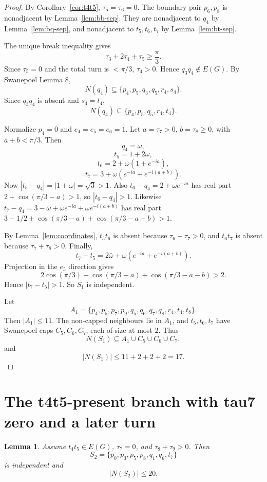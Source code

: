\documentclass[11pt]{article}
\newtheorem{lemma}{Lemma}
\begin{document}
\begin{proof}
By Corollary~\ref{cor:t4t5}, $\tau_5=\tau_6=0$. The boundary pair $p_6,p_8$ is nonadjacent by Lemma~\ref{lem:bb-sep}. They are nonadjacent to $q_4$ by Lemma~\ref{lem:bq-sep}, and nonadjacent to $t_5,t_6,t_7$ by Lemma~\ref{lem:bt-sep}.

The unique break inequality gives
\[
  \tau_3+2\tau_4+\tau_5\ge\frac{\pi}{3}.
\]
Since $\tau_5=0$ and the total turn is $<\pi/3$, $\tau_4>0$. Hence $q_3q_4\notin E(G)$. By Swanepoel Lemma 8,
\[
  N(q_4)\subseteq \{p_4,p_5,q_3,q_5,r_4,s_4\}.
\]
Since $q_3q_4$ is absent and $s_4=t_4$,
\[
  N(q_4)\subseteq\{p_4,p_5,q_5,r_4,t_4\}.
\]

Normalize $p_4=0$ and $e_4=e_5=e_6=1$. Let $a=\tau_7>0$, $b=\tau_8\ge0$, with $a+b<\pi/3$. Then
\[
  q_4=\omega,
\]
\[
  t_5=1+2\omega,
\]
\[
  t_6=2+\omega(1+e^{-ia}),
\]
\[
  t_7=3+\omega(e^{-ia}+e^{-i(a+b)}).
\]
Now $|t_5-q_4|=|1+\omega|=\sqrt3>1$. Also $t_6-q_4=2+\omega e^{-ia}$ has real part $2+\cos(\pi/3-a)>1$, so $|t_6-q_4|>1$. Likewise $t_7-q_4=3-\omega+\omega e^{-ia}+\omega e^{-i(a+b)}$ has real part $3-1/2+\cos(\pi/3-a)+\cos(\pi/3-a-b)>1$.

By Lemma~\ref{lem:coordinates}, $t_5t_6$ is absent because $\tau_6+\tau_7>0$, and $t_6t_7$ is absent because $\tau_7+\tau_8>0$. Finally,
\[
  t_7-t_5=2\bar\omega+\omega(e^{-ia}+e^{-i(a+b)}).
\]
Projection in the $e_5$ direction gives
\[
  2\cos(\pi/3)+\cos(\pi/3-a)+\cos(\pi/3-a-b)>2.
\]
Hence $|t_7-t_5|>1$. So $S_1$ is independent.

Let
\[
  A_1=\{p_4,p_5,p_7,p_9,q_5,q_6,q_7,q_8,r_4,t_4,t_8\}.
\]
Then $|A_1|\le11$. The non-capped neighbours lie in $A_1$, and $t_5,t_6,t_7$ have Swanepoel caps $C_5,C_6,C_7$, each of size at most $2$. Thus
\[
  N(S_1)\subseteq A_1\cup C_5\cup C_6\cup C_7,
\]
and
\[
  |N(S_1)|\le11+2+2+2=17.
\]
\end{proof}

\section{The t4t5-present branch with tau7 zero and a later turn}

\begin{lemma}\label{lem:S2}
Assume $t_4t_5\in E(G)$, $\tau_7=0$, and $\tau_8+\tau_9>0$. Then
\[
  S_2=\{p_0,p_3,p_5,p_8,q_1,q_6,t_7\}
\]
is independent and
\[
  |N(S_2)|\le20.
\]
\end{lemma}
\end{document}
